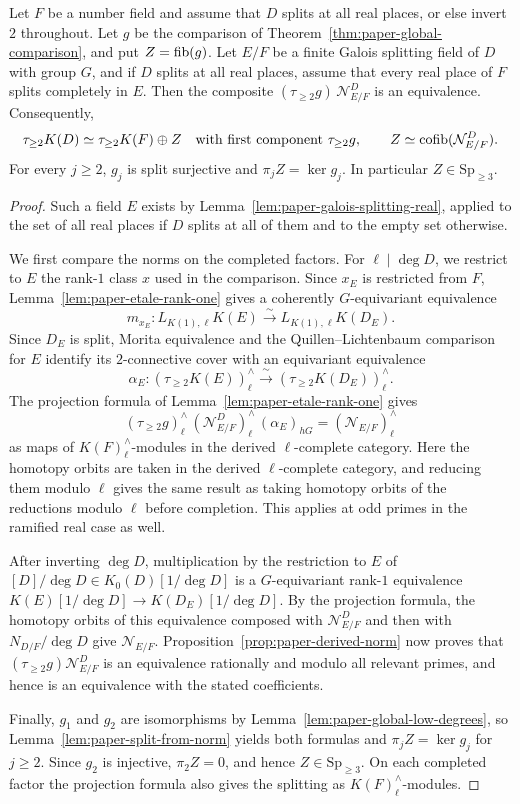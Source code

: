 \begin{theorem}\label{thm:paper-global-split}
Let $F$ be a number field and assume that $D$ splits at all real places, or else invert $2$ throughout.
Let $g$ be the comparison of Theorem~\ref{thm:paper-global-comparison}, and put $Z=\operatorname{fib}(g)$.
Let $E/F$ be a finite Galois splitting field of $D$ with group $G$, and if $D$ splits at all real places, assume that every real place of $F$ splits completely in $E$.
Then the composite $(\tau_{\ge2}g)\,\mathcal N^{D}_{E/F}$ is an equivalence.
Consequently,
\[
 \tau_{\ge2}K(D)\simeq\tau_{\ge2}K(F)\oplus Z
 \quad\text{with first component }\tau_{\ge2}g,
 \qquad Z\simeq\operatorname{cofib}(\mathcal N^{D}_{E/F}).
\]
For every $j\ge2$, $g_j$ is split surjective and $\pi_jZ=\ker g_j$.
In particular $Z\in\mathrm{Sp}_{\ge3}$.
\end{theorem}
\begin{proof}
Such a field $E$ exists by Lemma~\ref{lem:paper-galois-splitting-real}, applied to the set of all real places if $D$ splits at all of them and to the empty set otherwise.

We first compare the norms on the completed factors.
For $\ell\mid \deg D$, we restrict to $E$ the rank-$1$ class $x$ used in the comparison.
Since $x_E$ is restricted from $F$, Lemma~\ref{lem:paper-etale-rank-one} gives a coherently $G$-equivariant equivalence
\[
 m_{x_E}\colon L_{K(1),\ell}K(E)\xrightarrow{\ \sim\ }L_{K(1),\ell}K(D_E).
\]
Since $D_E$ is split, Morita equivalence and the Quillen--Lichtenbaum comparison for $E$ identify its $2$-connective cover with an equivariant equivalence
\[
 \alpha_E\colon(\tau_{\ge2}K(E))^\wedge_\ell\xrightarrow{\ \sim\ }(\tau_{\ge2}K(D_E))^\wedge_\ell.
\]
The projection formula of Lemma~\ref{lem:paper-etale-rank-one} gives
\[
   (\tau_{\ge2}g)^\wedge_\ell\,(\mathcal N^{D}_{E/F})^\wedge_\ell\,
           (\alpha_E)_{hG}=(\mathcal N_{E/F})^\wedge_\ell
\]
as maps of $K(F)^\wedge_\ell$-modules in the derived $\ell$-complete category.
Here the homotopy orbits are taken in the derived $\ell$-complete category, and reducing them modulo $\ell$ gives the same result as taking homotopy orbits of the reductions modulo $\ell$ before completion.
This applies at odd primes in the ramified real case as well.

After inverting $\deg D$, multiplication by the restriction to $E$ of $[D]/\deg D\in K_0(D)[1/\deg D]$ is a $G$-equivariant rank-$1$ equivalence $K(E)[1/\deg D]\to K(D_E)[1/\deg D]$.
By the projection formula, the homotopy orbits of this equivalence composed with $\mathcal N^{D}_{E/F}$ and then with $N_{D/F}/\deg D$ give $\mathcal N_{E/F}$.
Proposition~\ref{prop:paper-derived-norm} now proves that $(\tau_{\ge2}g)\mathcal N^{D}_{E/F}$ is an equivalence rationally and modulo all relevant primes, and hence is an equivalence with the stated coefficients.

Finally, $g_1$ and $g_2$ are isomorphisms by Lemma~\ref{lem:paper-global-low-degrees}, so Lemma~\ref{lem:paper-split-from-norm} yields both formulas and $\pi_jZ=\ker g_j$ for $j\ge2$.
Since $g_2$ is injective, $\pi_2Z=0$, and hence $Z\in\mathrm{Sp}_{\ge3}$.
On each completed factor the projection formula also gives the splitting as $K(F)^\wedge_\ell$-modules.
\end{proof}

